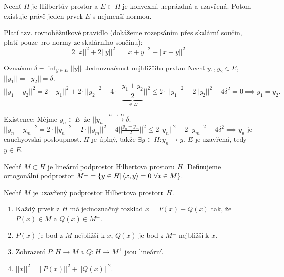 \documentclass[12pt]{article}					%
\begin{document}
	\begin{veta}
		Nechť $H$ je Hilbertův prostor a $E \subset H$ je konvexní, neprázdná a uzavřená. Potom existuje právě jeden prvek $E$ s nejmenší normou.

		\begin{dukazin}
			Platí tzv. rovnoběžníkové pravidlo (dokážeme rozepsáním přes skalární součin, platí pouze pro normy ze skalárního součinu):
			$$ 2||x||^2 + 2||y||^2 = ||x + y||^2 + ||x - y||^2 $$
			
			Označme $\delta = \inf_{y \in E} ||y||$. Jednoznačnost nejbližšího prvku: Nechť $y_1, y_2 \in E$, $||y_1|| = ||y_2|| = \delta$.
			$$ ||y_1 - y_2||^2 = 2·||y_1||^2 + 2·||y_2||^2 - 4·||\underbrace{\frac{y_1 + y_2}{2}}_{\in E}||^2 ≤ 2·||y_1||^2 + 2||y_2||^2 - 4\delta^2 = 0 \implies y_1 = y_2. $$

			Existence: Mějme $y_n \in E$, že $||y_n|| \overset{n \rightarrow ∞}{\rightarrow} \delta$. $||y_n - y_m||^2 = 2·||y_n||^2 + 2·||y_m||^2 - 4||\frac{y_n + y_m}{2}||^2 ≤ 2||y_n||^2 - 2||y_m||^2 - 4\delta^2 \implies y_n$ je cauchyovská posloupnost. $H$ je úplný, takže $\exists y \in H: y_n \rightarrow y$. $E$ je uzavřená, tedy $y \in E$.
		\end{dukazin}
	\end{veta}

	\begin{definice}
		Nechť $M \subset H$ je lineární podprostor Hilbertova prostoru $H$. Definujeme ortogonální podprostor $M^\perp = \{y \in H|\left\langle x, y\right\rangle = 0\ \forall x \in M\}$.
	\end{definice}

	\begin{veta}
		Nechť $M$ je uzavřený podprostor Hilbertova prostoru $H$.

		\begin{enumerate}
			\item Každý prvek z $H$ má jednoznačný rozklad $x = P(x) + Q(x)$ tak, že $P(x) \in M$ a $Q(x) \in M^\perp$.
			\item $P(x)$ je bod z $M$ nejbližší k $x$, $Q(x)$ je bod z $M^\perp$ nejbližší k $x$.
			\item Zobrazení $P: H \rightarrow M$ a $Q: H \rightarrow M^\perp$ jsou lineární.
			\item $||x||^2 = ||P(x)||^2 + ||Q(x)||^2$.
		\end{enumerate}
	\end{veta}
\end{document}
